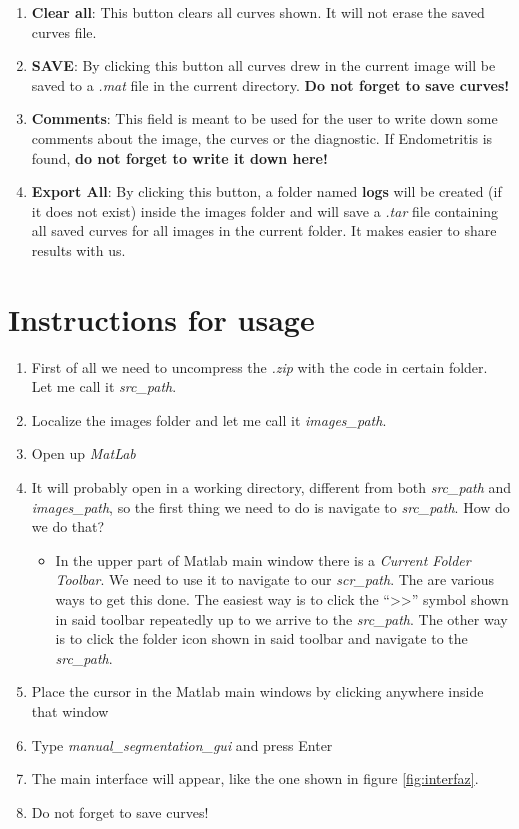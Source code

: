 \documentclass[12pt,a4paper,titlepage]{report}
\begin{document}
\begin{enumerate}
	\item \textbf{Clear all}: This button clears all curves shown. It will not erase the saved curves file.
	\item \textbf{SAVE}: By clicking this button all curves drew in the current image will be saved to a \emph{.mat} file in the current directory. \textbf{Do not forget to save curves!}
	\item \textbf{Comments}: This field is meant to be used for the user to write down some comments about the image, the curves or the diagnostic. If Endometritis is found, \textbf{do not forget to write it down here!}
	\item \textbf{Export All}: By clicking this button, a folder named \textbf{logs} will be created (if it does not exist) inside the images folder and will save a \emph{.tar} file containing all saved curves for all images in the current folder. It makes easier to share results with us.
\end{enumerate}


\section{Instructions for usage}

\begin{enumerate}
	\item First of all we need to uncompress the \emph{.zip} with the code in certain folder. Let me call it \emph{src\_path}.
	\item Localize the images folder and let me call it \emph{images\_path}.
	\item Open up \emph{MatLab}
	\item It will probably open in a working directory, different from both \emph{src\_path} and \emph{images\_path}, so the first thing we need to do is navigate to \emph{src\_path}. How do we do that? 
	\begin{itemize}
		\item In the upper part of Matlab main window there is a \emph{Current Folder Toolbar}. We need to use it to navigate to our \emph{scr\_path}. The are various ways to get this done. The easiest way is to click the ``>>'' symbol shown in said toolbar repeatedly up to we arrive to the \emph{src\_path}. The other way is to click the folder icon shown in said toolbar and navigate to the \emph{src\_path}.
	\end{itemize}
	\item Place the cursor in the Matlab main windows by clicking anywhere inside that window
	\item Type \emph{manual\_segmentation\_gui} and press Enter
	\item The main interface will appear, like the one shown in figure \ref{fig:interfaz}.
	\item Do not forget to save curves!
\end{enumerate}
\end{document}
